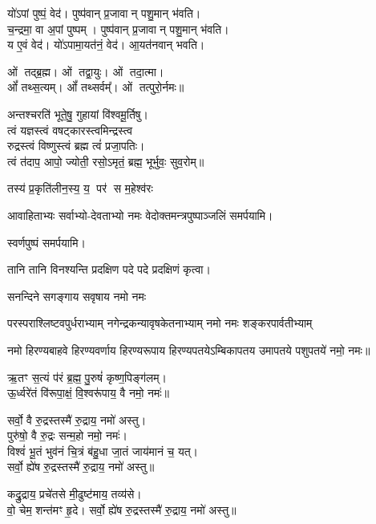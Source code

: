 \begin{center}
यो॑ऽपां पुष्पं॒ वेद॑। पुष्प॑वान् प्र॒जावान् पशु॒मान् भ॑वति।\\
च॒न्द्रमा॒ वा अ॒पां पुष्पम्। पुष्प॑वान् प्र॒जावान् पशु॒मान् भ॑वति।\\
य ए॒वं वेद॑। यो॑ऽपामा॒यत॑नं॒ वेद॑। आ॒यत॑नवान् भवति।\medskip

ओं तद्ब्र॒ह्म। ओं तद्वा॒युः। ओं तदा॒त्मा।\\ ओं᳚ तथ्स॒त्यम्‌।
ओं᳚ तथ्सर्वम्᳚‌। ओं तत्पुरो॒र्नमः॥\medskip

अन्तश्चरति॑ भूते॒षु॒ गुहायां वि॑श्वमू॒र्तिषु। \\
त्वं यज्ञस्त्वं वषट्कारस्त्वमिन्द्रस्त्व\\ रुद्रस्त्वं विष्णुस्त्वं ब्रह्म त्वं॑ प्रजा॒पतिः। \\
त्वं त॑दाप॒ आपो॒ ज्योती॒ रसो॒ऽमृतं॒ ब्रह्म॒ भूर्भुवः॒ सुव॒रोम्‌॥\medskip

{तस्य॑ प्र॒कृति॑लीन॒स्य॒ य॒ पर॑ स म॒हेश्व॑रः}
\medskip

आवाहिताभ्यः सर्वाभ्यो-देवताभ्यो नमः वेदोक्तमन्त्रपुष्पाञ्जलिं समर्पयामि।\medskip

स्वर्णपुष्पं समर्पयामि।\medskip


{तानि तानि विनश्यन्ति प्रदक्षिण पदे पदे}
प्रदक्षिणं कृत्वा।\medskip

{सनन्दिने सगङ्गाय सवृषाय नमो नमः}

{परस्पराश्लिष्टवपुर्धराभ्याम्‌}
{नगेन्द्रकन्यावृषकेतनाभ्याम्‌}
{नमो नमः शङ्करपार्वतीभ्याम्‌}%

नमो हिरण्यबाहवे हिरण्यवर्णाय हिरण्यरूपाय हिरण्यपतये\-ऽम्बिकापतय उमापतये पशुपतये॑ नमो॒ नमः॥%

ऋ॒तꣳ स॒त्यं प॑रं ब्र॒ह्म॒ पु॒रुषं॑ कृष्ण॒पिङ्ग॑लम्।\\ 
ऊ॒र्ध्वरे॑तं वि॑रूपा॒क्षं॒ वि॒श्वरू॑पाय॒ वै नमो॒ नमः॑॥%

सर्वो॒ वै रु॒द्रस्तस्मै॑ रु॒द्राय॒ नमो॑ अस्तु।\\ 
पुरु॑षो॒ वै रु॒द्रः सन्म॒हो नमो॒ नमः॑।\\
विश्वं॑ भू॒तं भुव॑नं चि॒त्रं ब॑हु॒धा जा॒तं जाय॑मानं च॒ यत्।\\
सर्वो॒ ह्ये॑ष रु॒द्रस्तस्मै॑ रु॒द्राय॒ नमो॑ अस्तु॥%


कद्रु॒द्राय॒ प्रचे॑तसे मी॒ढुष्ट॑माय॒ तव्य॑से।\\ 
वो॒ चेम॒ शन्त॑मꣳ हृ॒दे। 
सर्वो॒ ह्ये॑ष रु॒द्रस्तस्मै॑ रु॒द्राय॒ नमो॑ अस्तु॥%



\end{center}
